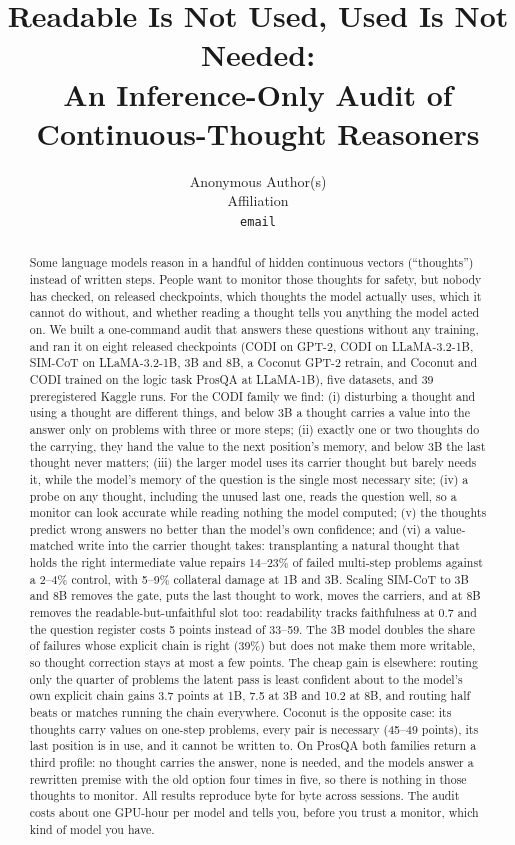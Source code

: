 \documentclass{article}
\title{Readable Is Not Used, Used Is Not Needed:\\An Inference-Only Audit of Continuous-Thought Reasoners}
\author{%
  Anonymous Author(s)\\
  Affiliation\\
  \texttt{email}\\
}
\begin{document}
\maketitle

\begin{abstract}
Some language models reason in a handful of hidden continuous vectors (``thoughts'') instead of written steps. People want to monitor those thoughts for safety, but nobody has checked, on released checkpoints, which thoughts the model actually uses, which it cannot do without, and whether reading a thought tells you anything the model acted on. We built a one-command audit that answers these questions without any training, and ran it on eight released checkpoints (CODI on GPT-2, CODI on LLaMA-3.2-1B, SIM-CoT on LLaMA-3.2-1B, 3B and 8B, a Coconut GPT-2 retrain, and Coconut and CODI trained on the logic task ProsQA at LLaMA-1B), five datasets, and 39 preregistered Kaggle runs. For the CODI family we find: (i) disturbing a thought and using a thought are different things, and below 3B a thought carries a value into the answer only on problems with three or more steps; (ii) exactly one or two thoughts do the carrying, they hand the value to the next position's memory, and below 3B the last thought never matters; (iii) the larger model uses its carrier thought but barely needs it, while the model's memory of the question is the single most necessary site; (iv) a probe on any thought, including the unused last one, reads the question well, so a monitor can look accurate while reading nothing the model computed; (v) the thoughts predict wrong answers no better than the model's own confidence; and (vi) a value-matched write into the carrier thought takes: transplanting a natural thought that holds the right intermediate value repairs 14--23\% of failed multi-step problems against a 2--4\% control, with 5--9\% collateral damage at 1B and 3B. Scaling SIM-CoT to 3B and 8B removes the gate, puts the last thought to work, moves the carriers, and at 8B removes the readable-but-unfaithful slot too: readability tracks faithfulness at 0.7 and the question register costs 5 points instead of 33--59. The 3B model doubles the share of failures whose explicit chain is right (39\%) but does not make them more writable, so thought correction stays at most a few points. The cheap gain is elsewhere: routing only the quarter of problems the latent pass is least confident about to the model's own explicit chain gains 3.7 points at 1B, 7.5 at 3B and 10.2 at 8B, and routing half beats or matches running the chain everywhere. Coconut is the opposite case: its thoughts carry values on one-step problems, every pair is necessary (45--49 points), its last position is in use, and it cannot be written to. On ProsQA both families return a third profile: no thought carries the answer, none is needed, and the models answer a rewritten premise with the old option four times in five, so there is nothing in those thoughts to monitor. All results reproduce byte for byte across sessions. The audit costs about one GPU-hour per model and tells you, before you trust a monitor, which kind of model you have.
\end{abstract}
\end{document}
